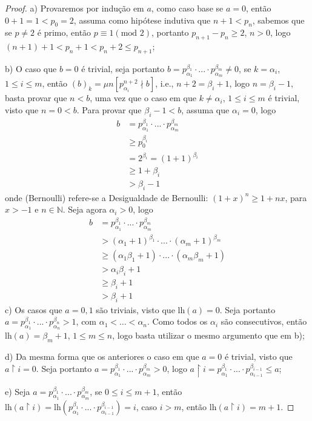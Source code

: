 \documentclass[11pt]{article}
\newcommand{\mbb}[1]{\mathbb{#1}}
\begin{document}
\begin{proof}
    a) Provaremos por indução em $a$, como caso base se $a=0$, então $0+1=1<p_0=2$, assuma como hipótese indutiva que $n+1<p_n$, sabemos que se $p\neq 2$ é primo, então $p\equiv1(\text{mod }2)$, portanto $p_{n+1}-p_n\geq2$, $n>0$, logo $(n+1)+1<p_n+1<p_n+2\leq p_{n+1}$;
    
    b) O caso que $b=0$ é trivial, seja portanto $b=p_{\alpha_1}^{\beta_1}\cdot...\cdot p_{\alpha_m}^{\beta_m}\neq0$, se $k=\alpha_i$, $1\leq i\leq m$, então $(b)_k=\mu n[p_{\alpha_i}^{n+2}\nmid b]$, i.e., $n+2=\beta_i+1$, logo $n=\beta_i-1$, basta provar que $n<b$, uma vez que o caso em que $k\neq\alpha_i$, $1\leq i\leq m$ é trivial, visto que $n=0<b$. Para provar que $\beta_i-1<b$, assuma que $\alpha_i=0$, logo
    \begin{align*}
        b & = p_{\alpha_1}^{\beta_1}\cdot...\cdot p_{\alpha_m}^{\beta_m}\\
        & \geq p_0^{\beta_i}\tag{$\alpha_i=0$}\\
        & = 2^{\beta_i} = (1 + 1)^{\beta_i}\\
        & \geq 1+\beta_i\tag{Bernoulli}\\
        & > \beta_i-1
    \end{align*}
    onde (Bernoulli) refere-se a Desigualdade de Bernoulli: $(1+x)^n\geq 1+nx$, para $x>-1$ e $n\in\mbb{N}$. Seja agora $\alpha_i>0$, logo
    \begin{align*}
        b & = p_{\alpha_1}^{\beta_1}\cdot...\cdot p_{\alpha_m}^{\beta_m}\\
        & > (\alpha_1+1)^{\beta_1}\cdot...\cdot (\alpha_m+1)^{\beta_m}\tag{$n+1<p_n$}\\
        & \geq (\alpha_1\beta_1+1)\cdot...\cdot(\alpha_m\beta_m+1)\tag{Bernoulli}\\
        & > \alpha_i\beta_i+1\\
        & \geq \beta_i+1\tag{$\alpha_i>0$}\\
        & > \beta_i+1
    \end{align*}
    c) Os casos que $a=0, 1$ são triviais, visto que $\text{lh}(a)=0$. Seja portanto $a=p_{\alpha_1}^{\beta_1}\cdot...\cdot p_{\alpha_n}^{\beta_n}>1$, com $\alpha_1<\dots<\alpha_n$. Como todos os $\alpha_i$ são consecutivos, então $\text{lh}(a)=\beta_m+1$, $1\leq m\leq n$, logo basta utilizar o mesmo argumento que em b);

    d) Da mesma forma que os anteriores o caso em que $a=0$ é trivial, visto que $a\upharpoonright i=0$. Seja portanto $a=p_{\alpha_1}^{\beta_1}\cdot...\cdot p_{\alpha_m}^{\beta_m}>0$, logo $a\upharpoonright i=p_{\alpha_1}^{\beta_1}\cdot...\cdot p_{\alpha_{i-1}}^{\beta_{i-1}}\leq a$;

    e) Seja $a=p_{\alpha_1}^{\beta_1}\cdot...\cdot p_{\alpha_m}^{\beta_m}$, se $0\leq i\leq m+1$, então $\text{lh}(a\upharpoonright i)=\text{lh}(p_{\alpha_1}^{\beta_1}\cdot...\cdot p_{\alpha_{i-1}}^{\beta_{i-1}})=i$, caso $i>m$, então $\text{lh}(a\upharpoonright i)=m+1$.
\end{proof}
\end{document}
